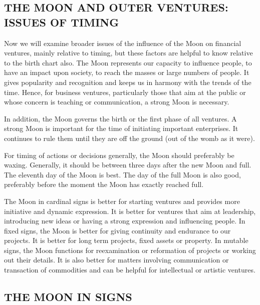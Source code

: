  



\subsection{THE MOON AND OUTER VENTURES: ISSUES OF TIMING}
 

Now we will examine broader issues of the influence of the Moon on financial ventures, mainly relative to timing, but these factors are helpful to know relative to the birth chart also. The Moon represents our capacity to influence people, to have an impact upon society, to reach the masses or large numbers of people. It gives popularity and recognition and keeps us in harmony with the trends of the time. Hence, for business ventures, particularly those that aim at the public or whose concern is teaching or communication, a strong Moon is necessary.

 

In addition, the Moon governs the birth or the first phase of all ventures. A strong Moon is important for the time of initiating important enterprises. It continues to rule them until they are off the ground (out of the womb as it were).

 

For timing of actions or decisions generally, the Moon should preferably be waxing. Generally, it should be between three days after the new Moon and full. The eleventh day of the Moon is best. The day of the full Moon is also good, preferably before the moment the Moon has exactly reached full.

 

The Moon in cardinal signs is better for starting ventures and provides more initiative and dynamic expression. It is better for ventures that aim at leadership, introducing new ideas or having a strong expression and influencing people. In fixed signs, the Moon is better for giving continuity and endurance to our projects. It is better for long term projects, fixed assets or property. In mutable signs, the Moon functions for reexamination or reformation of projects or working out their details. It is also better for matters involving communication or transaction of commodities and can be helpful for intellectual or artistic ventures.

\subsection{THE MOON IN SIGNS}
 

